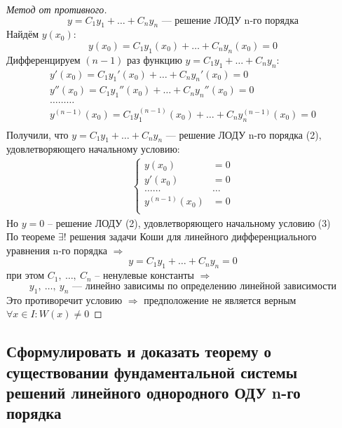 \begin{proof}[Метод от противного]
    \[
        y = C_1y_1 + \ldots + C_ny_n \text{ --- решение ЛОДУ n-го порядка}
    \]
    Найдём $y(x_0)$:
    \[
        y(x_0) = C_1y_1(x_0) + \ldots + C_ny_n(x_0) = 0
    \]
    Дифференцируем $(n-1)$ раз функцию $y = C_1y_1 + \ldots + C_ny_n$:
    \begin{align*}
        y'(x_0) = C_1y_1'(x_0) + \ldots + C_ny_n'(x_0) = 0 \\
        y''(x_0) = C_1y_1''(x_0) + \ldots + C_ny_n''(x_0) = 0 \\
        \ldots\ldots\ldots \\
        y^{(n-1)}(x_0) = C_1y_1^{(n-1)}(x_0) + \ldots + C_ny_n^{(n-1)}(x_0) = 0 \\
    \end{align*}
    Получили, что $y = C_1y_1 + \ldots + C_ny_n$ --- решение ЛОДУ n-го порядка (2), удовлетворяющего начальному условию:
    \begin{gather}
        \left\{ \begin{aligned}
            y(x_0) &= 0 \\
            y'(x_0) &= 0 \\
            \ldots\ldots&\ldots \\
            y^{(n-1)}(x_0) &= 0 \\
        \end{aligned}\right.
    \end{gather}
    Но $y=0$ -- решение ЛОДУ (2), удовлетворяющего начальному условию (3) \\
    По теореме $\exists!$ решения задачи Коши для линейного дифференциального уравнения n-го порядка $\Rightarrow$
    \[
        y = C_1y_1 + \ldots + C_ny_n = 0
    \]
    при этом $C_1,\ \ldots,\ C_n$ -- ненулевые константы $\Rightarrow$
    \[
        y_1,\ \ldots,\ y_n \text{ --- линейно зависимы по определению линейной зависимости}
    \]
    Это противоречит условию $\Rightarrow$ предположение не является верным $\forall x \in I\colon W(x) \ne 0$
\end{proof}

\subsection{Сформулировать и доказать теорему о существовании фундаментальной системы решений линейного однородного ОДУ n-го порядка}

